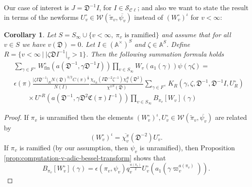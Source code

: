 \documentclass[a4paper,11pt]{amsart}
\newtheorem{corollary}[theorem]{Corollary}
\theoremstyle{definition}
\newcommand{\A}{\mathbb{A}}
\newcommand{\cl}{\mathcal{C}\ell}
\begin{document}
Our case of interest is $J=\mathfrak{D}^{-1}I$, for $I \in \mathcal{S}_{\cl}$; and also we want to state the result in terms of the newforms $U_v^{\circ}\in \mathcal{W}(\tilde{\pi}_v,\overline{\psi_v})$ instead of $(W_v^{\circ})^{\iota}$ for $v<\infty$:
\begin{corollary}\label{thm:voronoi1}Let $S= S_{\infty}\cup\{v<\infty,\ \pi_v \text{ is ramified}\}$ and assume that for all $v \in S$ we have $v(\mathfrak{D})=0$. Let $I \in (\A^{\times})^S$ and $\zeta\in \A^S$. Define $R=\{v<\infty \ |\ \vert{\zeta \mathfrak{D}I^{-1}\vert_v>1}\}$. Then the following summation formula holds
    \begin{align*}&\sum_{\gamma \in F^{\times}}W^{\circ}_{\operatorname{fin}}(a(\mathfrak{D}^{-1},\gamma \mathfrak{D}^{-1}I))\prod_{v \in S_{\infty}}W_v(a_1(\gamma)) \psi(\gamma\zeta)=\\&\epsilon(\pi)\frac{\vert{\zeta I\mathfrak{D}^{-1}}\vert_{R}N(\mathfrak{D})^{3/2}C(\pi)^{\frac{1}{2}}}{N(I)}\frac{\chi_{\pi_{R}}(I\mathfrak{D}^{-2}\zeta^{-1})\chi_{\pi}^R(\mathfrak{D}^2)}{{\chi^\pi}^S(\mathfrak{D})}\sum_{\gamma \in F^{\times}}K_{R}(\gamma,\zeta, \mathfrak{D}^{-1},\mathfrak{D}^{-1}I, U^{\circ}_R)\\&\qquad \times U^{\circ R}(a(\mathfrak{D}^{-1},\gamma \mathfrak{D}^2\mathfrak{C}(\pi)I^{-1}))\prod_{v\in S_{\infty}}B_{\pi_v}[W_v](\gamma)
    \end{align*}
\end{corollary}
\begin{proof}
    If $\pi_v$ is unramified then the elements $(W^{\circ}_v)^{\iota}, U_v^{\circ}\in \mathcal{W}(\tilde{\pi}_v,\overline{\psi_v})$ are related by $$(W^{\circ}_v)^{\iota} = \overline{\chi^\pi_{v}}(\mathfrak{D}^{-2})U_v^{\circ}.$$ 
    If $\pi_v$ is ramified (by our assumption, then $\psi_v$ is unramified), then Proposition \ref{prop:computation-v-adic-bessel-transform} shows that \[B_{\pi_v}[W_v^{\circ}](\gamma) = \epsilon(\pi_v,\psi_v)q_v^{\frac{a(\pi_v)}{2}}U_v^{\circ}(a_1(\gamma\varpi_v^{a(\pi_v)})).\]
\end{proof}
\end{document}
